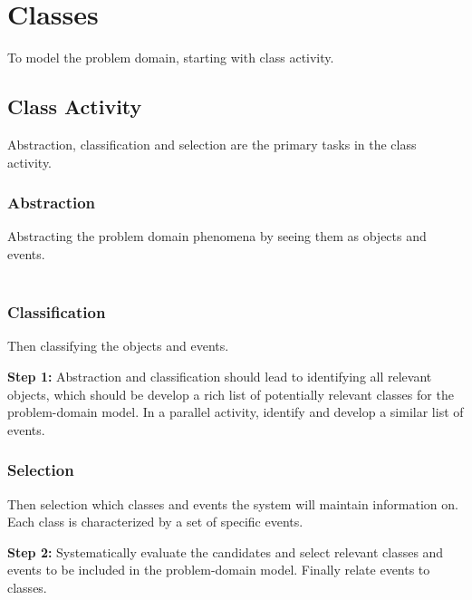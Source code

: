 \chapter{Classes \ooad[51]}
To model the problem domain, starting with class activity.

\section{Class Activity}
Abstraction, classification and selection are the primary tasks in the class activity.

\subsection*{Abstraction}
Abstracting the problem domain phenomena by seeing them as objects and events.\\\\

\subsection*{Classification}
Then classifying the objects and events.

\textbf{Step 1:} Abstraction and classification should lead to identifying all relevant objects, which should be develop a rich list of potentially relevant classes for the problem-domain model. In a parallel activity, identify and develop a similar list of events.

\subsection*{Selection}
Then selection which classes and events the system will maintain information on. Each class is characterized by a set of specific events.

\textbf{Step 2:} Systematically evaluate the candidates and select relevant classes and events to be included in the problem-domain model. Finally relate events to classes. 

